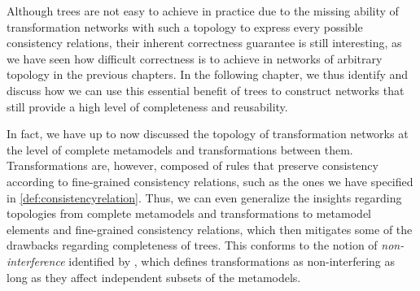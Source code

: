 Although trees are not easy to achieve in practice due to the missing ability of transformation networks with such a topology to express every possible consistency relations, their inherent correctness guarantee is still interesting, as we have seen how difficult correctness is to achieve in networks of arbitrary topology in the previous chapters.
In the following chapter, we thus identify and discuss how we can use this essential benefit of trees to construct networks that still provide a high level of completeness and reusability.

In fact, we have up to now discussed the topology of transformation networks at the level of complete metamodels and transformations between them.
Transformations are, however, composed of rules that preserve consistency according to fine-grained consistency relations, such as the ones we have specified in \autoref{def:consistencyrelation}.
Thus, we can even generalize the insights regarding topologies from complete metamodels and transformations to metamodel elements and fine-grained consistency relations, which then mitigates some of the drawbacks regarding completeness of trees.
This conforms to the notion of \emph{non-interference} identified by \textcite{stevens2020BidirectionalTransformationLarge-SoSym}, which defines transformations as non-interfering as long as they affect independent subsets of the metamodels.






